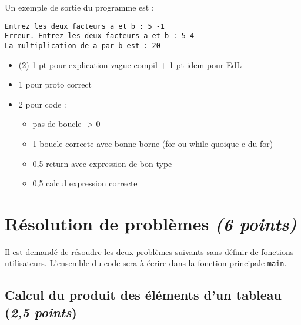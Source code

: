 Un exemple de sortie du programme est :
\begin{verbatim}
Entrez les deux facteurs a et b : 5 -1
Erreur. Entrez les deux facteurs a et b : 5 4
La multiplication de a par b est : 20
\end{verbatim}

\begin{correction}
\begin{itemize}
\item (2) 1 pt pour explication vague compil + 1 pt idem pour EdL
\item 1 pour proto correct
\item 2 pour code :
  \begin{itemize}
  \item pas de boucle -> 0
  \item 1 boucle correcte avec bonne borne (for ou while quoique c du for)
  \item 0,5 return avec expression de bon type
  \item 0,5 calcul expression correcte
  \end{itemize}
\end{itemize}
\end{correction}

\section{Résolution de problèmes \textit{(6 points)}}

Il est demandé de résoudre les deux problèmes suivants sans définir de fonctions utilisateurs.
L'ensemble du code sera à écrire dans la fonction principale \verb|main|.

\subsection{Calcul du produit des éléments d'un tableau (\textit{2,5 points})}

